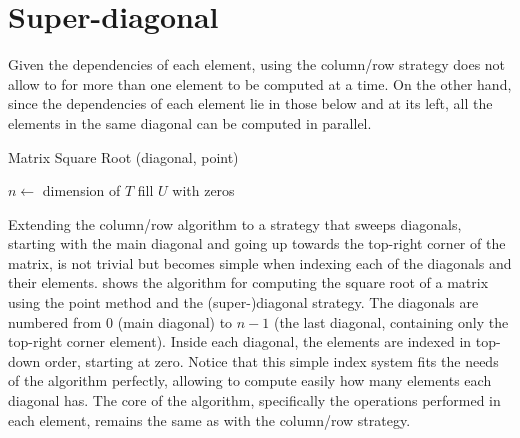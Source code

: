 \documentclass[../thesis]{subfiles}
\begin{document}
		\section{Super-diagonal}		

		Given the dependencies of each element, using the column/row strategy does not allow to for more than one element to be computed at a time. On the other hand, since the dependencies of each element lie in those below and at its left, all the elements in the same diagonal can be computed in parallel.

		\begin{algorithm}[!t]
			\caption{Matrix Square Root (diagonal, point)}
			\label{alg:multicore:diagonal:point}
			\DontPrintSemicolon


			$n \leftarrow$ dimension of $T$\;
			fill $U$ with zeros\;

		\end{algorithm}

		Extending the column/row algorithm to a strategy that sweeps diagonals, starting with the main diagonal and going up towards the top-right corner of the matrix, is not trivial but becomes simple when indexing each of the diagonals and their elements.  shows the algorithm for computing the square root of a matrix using the point method and the (super-)diagonal strategy. The diagonals are numbered from $0$ (main diagonal) to $n-1$ (the last diagonal, containing only the top-right corner element). Inside each diagonal, the elements are indexed in top-down order, starting at zero. Notice that this simple index system fits the needs of the algorithm perfectly, allowing to compute easily how many elements each diagonal has. The core of the algorithm, specifically the operations performed in each element, remains the same as with the column/row strategy.
\end{document}

